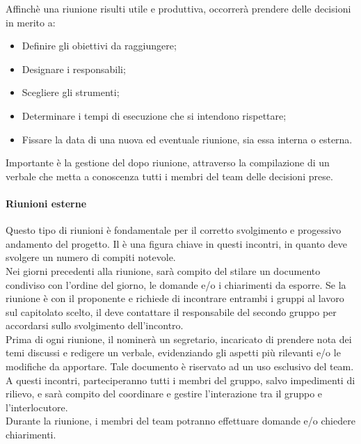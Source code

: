 			Affinchè una riunione risulti utile e produttiva, occorrerà prendere delle decisioni in merito a:
			\begin{itemize}
				\item
				Definire gli obiettivi da raggiungere;
				\item
				Designare i responsabili;
				\item
				Scegliere gli strumenti;
				\item
				Determinare i tempi di esecuzione che si intendono rispettare;
				\item
				Fissare la data di una nuova ed eventuale riunione, sia essa interna o esterna.
			\end{itemize}
			
			Importante è la gestione del dopo riunione, attraverso la compilazione di un verbale che metta a conoscenza tutti i membri del team delle decisioni prese.
		
			\paragraph{Riunioni esterne}
			Questo tipo di riunioni è fondamentale per il corretto svolgimento e progessivo andamento del progetto.
			Il \textit{\RdP} è una figura chiave in questi incontri, in quanto deve svolgere un numero di compiti notevole.\\
			Nei giorni precedenti alla riunione, sarà compito del \textit{\RdP} stilare un documento condiviso con l'ordine del giorno, le domande e/o i chiarimenti da esporre. Se la riunione è con il proponente e richiede di incontrare entrambi i gruppi al lavoro sul capitolato scelto, il \textit{\RdP} deve contattare il responsabile del secondo gruppo per accordarsi sullo svolgimento dell'incontro.\\
			Prima di ogni riunione, il \textit{\RdP} nominerà un segretario, incaricato di prendere nota dei temi discussi e redigere un verbale, evidenziando gli aspetti più rilevanti e/o le modifiche da apportare. Tale documento è riservato ad un uso esclusivo del team.\\
			A questi incontri, parteciperanno tutti i membri del gruppo, salvo impedimenti di rilievo, e sarà compito del \textit{\RdP} coordinare e gestire l'interazione tra il gruppo e l'interlocutore.\\
			Durante la riunione, i membri del team potranno effettuare domande e/o chiedere chiarimenti. 
			
